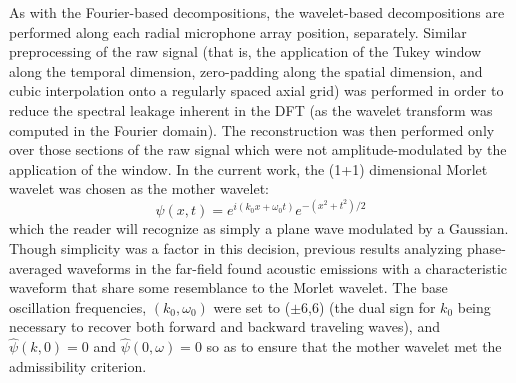 \documentclass[english]{aiaa-tc}
\begin{document}
As with the Fourier-based decompositions, the wavelet-based
decompositions are performed along each radial microphone array
position, separately. Similar preprocessing of the raw signal (that
is, the application of the Tukey window along the temporal dimension,
zero-padding along the spatial dimension, and cubic interpolation onto
a regularly spaced axial grid) was performed in order to reduce the
spectral leakage inherent in the DFT (as the wavelet transform was
computed in the Fourier domain). The reconstruction was then performed
only over those sections of the raw signal which were not
amplitude-modulated by the application of the window. In the current
work, the (1+1) dimensional Morlet wavelet was chosen as the mother
wavelet: 
\begin{equation}
\psi(x,t)=e^{i(k_{0}x+\omega_{0}t)}e^{-(x^{2}+t^{2})/2}
\end{equation}
which the reader will recognize as simply a plane wave modulated by a
Gaussian. Though simplicity was a factor in this decision, previous
results analyzing phase-averaged waveforms in the far-field found
acoustic emissions with a characteristic waveform that share some
resemblance to the Morlet wavelet\cite{Crawley2014}. The base
oscillation frequencies, $(k_{0},\omega_{0})$ were set to ($\pm$6,6)
(the dual sign for $k_{0}$ being necessary to recover both forward and
backward traveling waves), and $\hat{\psi}(k,0)=0$ and $\hat{\psi}
(0,\omega) =0$ so as to ensure that the mother wavelet met the
admissibility criterion. 
 
\end{document}
